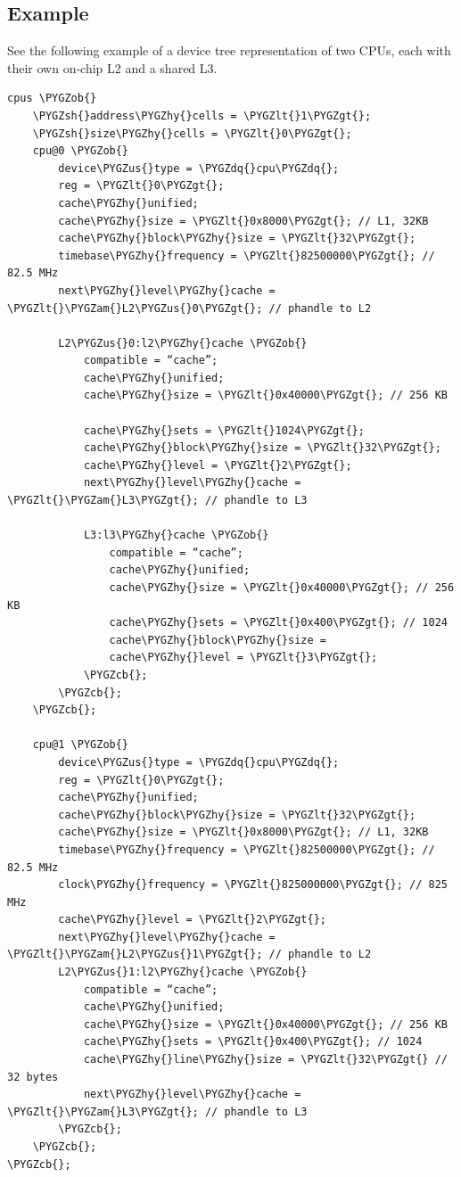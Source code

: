 \documentclass[a4paper,10pt,oneside]{sphinxmanual}
\def\PYGZus{\char`\_}
\def\PYGZob{\char`\{}
\def\PYGZcb{\char`\}}
\def\PYGZam{\char`\&}
\def\PYGZlt{\char`\<}
\def\PYGZgt{\char`\>}
\def\PYGZsh{\char`\#}
\def\PYGZhy{\char`\-}
\def\PYGZdq{\char`\"}
\begin{document}
\subsection{Example}
\label{devicenodes:id1}
See the following example of a device tree representation of two CPUs,
each with their own on-chip L2 and a shared L3.

\begin{Verbatim}[commandchars=\\\{\}]
cpus \PYGZob{}
    \PYGZsh{}address\PYGZhy{}cells = \PYGZlt{}1\PYGZgt{};
    \PYGZsh{}size\PYGZhy{}cells = \PYGZlt{}0\PYGZgt{};
    cpu@0 \PYGZob{}
        device\PYGZus{}type = \PYGZdq{}cpu\PYGZdq{};
        reg = \PYGZlt{}0\PYGZgt{};
        cache\PYGZhy{}unified;
        cache\PYGZhy{}size = \PYGZlt{}0x8000\PYGZgt{}; // L1, 32KB
        cache\PYGZhy{}block\PYGZhy{}size = \PYGZlt{}32\PYGZgt{};
        timebase\PYGZhy{}frequency = \PYGZlt{}82500000\PYGZgt{}; // 82.5 MHz
        next\PYGZhy{}level\PYGZhy{}cache = \PYGZlt{}\PYGZam{}L2\PYGZus{}0\PYGZgt{}; // phandle to L2

        L2\PYGZus{}0:l2\PYGZhy{}cache \PYGZob{}
            compatible = “cache”;
            cache\PYGZhy{}unified;
            cache\PYGZhy{}size = \PYGZlt{}0x40000\PYGZgt{}; // 256 KB

            cache\PYGZhy{}sets = \PYGZlt{}1024\PYGZgt{};
            cache\PYGZhy{}block\PYGZhy{}size = \PYGZlt{}32\PYGZgt{};
            cache\PYGZhy{}level = \PYGZlt{}2\PYGZgt{};
            next\PYGZhy{}level\PYGZhy{}cache = \PYGZlt{}\PYGZam{}L3\PYGZgt{}; // phandle to L3

            L3:l3\PYGZhy{}cache \PYGZob{}
                compatible = “cache”;
                cache\PYGZhy{}unified;
                cache\PYGZhy{}size = \PYGZlt{}0x40000\PYGZgt{}; // 256 KB
                cache\PYGZhy{}sets = \PYGZlt{}0x400\PYGZgt{}; // 1024
                cache\PYGZhy{}block\PYGZhy{}size =
                cache\PYGZhy{}level = \PYGZlt{}3\PYGZgt{};
            \PYGZcb{};
        \PYGZcb{};
    \PYGZcb{};

    cpu@1 \PYGZob{}
        device\PYGZus{}type = \PYGZdq{}cpu\PYGZdq{};
        reg = \PYGZlt{}0\PYGZgt{};
        cache\PYGZhy{}unified;
        cache\PYGZhy{}block\PYGZhy{}size = \PYGZlt{}32\PYGZgt{};
        cache\PYGZhy{}size = \PYGZlt{}0x8000\PYGZgt{}; // L1, 32KB
        timebase\PYGZhy{}frequency = \PYGZlt{}82500000\PYGZgt{}; // 82.5 MHz
        clock\PYGZhy{}frequency = \PYGZlt{}825000000\PYGZgt{}; // 825 MHz
        cache\PYGZhy{}level = \PYGZlt{}2\PYGZgt{};
        next\PYGZhy{}level\PYGZhy{}cache = \PYGZlt{}\PYGZam{}L2\PYGZus{}1\PYGZgt{}; // phandle to L2
        L2\PYGZus{}1:l2\PYGZhy{}cache \PYGZob{}
            compatible = “cache”;
            cache\PYGZhy{}unified;
            cache\PYGZhy{}size = \PYGZlt{}0x40000\PYGZgt{}; // 256 KB
            cache\PYGZhy{}sets = \PYGZlt{}0x400\PYGZgt{}; // 1024
            cache\PYGZhy{}line\PYGZhy{}size = \PYGZlt{}32\PYGZgt{} // 32 bytes
            next\PYGZhy{}level\PYGZhy{}cache = \PYGZlt{}\PYGZam{}L3\PYGZgt{}; // phandle to L3
        \PYGZcb{};
    \PYGZcb{};
\PYGZcb{};
\end{Verbatim}
\end{document}
